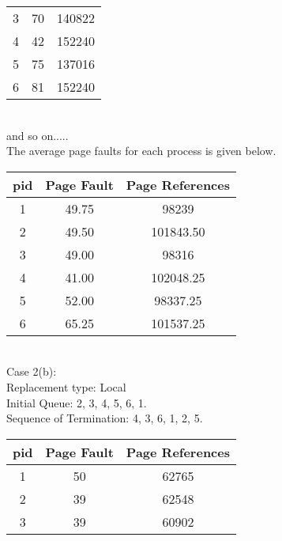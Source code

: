 \documentclass[a4paper,12pt]{article}
\begin{document}
\begin{enumerate}
\begin{table}[h!]
\begin{center}
\begin{tabular}{c|c|c}
             3   & 70   & 140822 \\
             4   & 42   & 152240 \\
             5   & 75   & 137016 \\
             6   & 81   & 152240 \\
             \end{tabular}
           \end{center}
         \end{table}\\
         and so on.....\\
         The average page faults for each process is given below.
         \begin{table}[h!]
           \begin{center}
             \begin{tabular}{c|c|c}
             \textbf{pid} & \textbf{Page Fault} & \textbf{Page References} \\
             \hline
             1   & 49.75   & 98239 \\
             2   & 49.50   & 101843.50 \\
             3   & 49.00   & 98316 \\
             4   & 41.00   & 102048.25 \\
             5   & 52.00   & 98337.25 \\
             6   & 65.25   & 101537.25 \\
             \end{tabular}
           \end{center}
         \end{table}\\
         Case 2(b):\\
         Replacement type: Local\\
         Initial Queue: 2, 3, 4, 5, 6, 1.\\
         Sequence of Termination: 4, 3, 6, 1, 2, 5.\\
         \begin{table}[h!]
           \begin{center}
             \begin{tabular}{c|c|c}
             \textbf{pid} & \textbf{Page Fault} & \textbf{Page References} \\
             \hline
             1   & 50   & 62765 \\
             2   & 39   & 62548 \\
             3   & 39   & 60902 \\

\end{tabular}
\end{center}
\end{table}
\end{enumerate}
\end{document}
